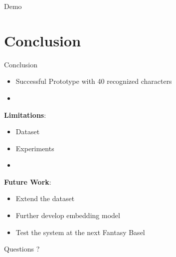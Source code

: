 \documentclass[aspectratio=169]{beamer}
\begin{document}
\begin{frame}
   \centering
   \Huge
   Demo 
\end{frame}

\section{Conclusion}
\begin{frame}{Conclusion}
    \begin{itemize}
        \item Successful Prototype with 40 recognized characters  
        \item[] %
    \end{itemize}

    \textbf{Limitations}: 
    \begin{itemize} 
        \item Dataset
        \item Experiments 
        \item[] %
    \end{itemize}

    \textbf{Future Work}: 
    \begin{itemize} 
        \item Extend the dataset
        \item Further develop embedding model %
        \item Test the system at the next Fantasy Basel
    \end{itemize}
\end{frame}

\begin{frame}
    \centering 
    \Huge 
    Questions ? 
\end{frame}
\end{document}
